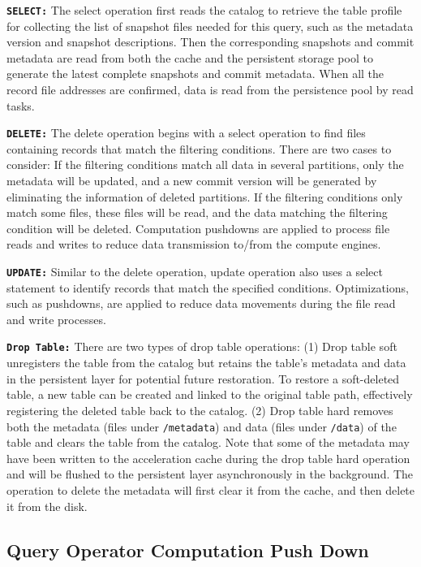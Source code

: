 \noindent \textbf{\texttt{SELECT:}} The select operation first reads the catalog to retrieve the table profile for collecting the list of snapshot files needed for this query, such as the metadata version and snapshot descriptions. Then the corresponding snapshots and commit metadata are read from both the  cache and the persistent storage pool to generate the latest complete snapshots and commit metadata. When all the record file addresses are confirmed, data is read from the persistence pool by read tasks.

\noindent \textbf{\texttt{DELETE:}} The delete operation begins with a select operation to find files containing records that match the filtering conditions. There are two cases to consider:
If the filtering conditions match all data in several partitions, only the metadata will be updated, and a new commit version will be generated by eliminating the information of deleted partitions.
If the filtering conditions only match some files, these files will be read, and the data matching the filtering condition will be deleted. Computation pushdowns are applied to process file reads and writes to reduce data transmission to/from the compute engines.


\noindent \textbf{\texttt{UPDATE:}} Similar to the delete operation, update operation also uses a select statement to identify records that match the specified conditions. Optimizations, such as pushdowns, are applied to reduce data movements during the file read and write processes.

\noindent \textbf{\texttt{Drop Table:}} There are two types of drop table operations:
 (1) Drop table soft unregisters the table from the catalog but retains the table's metadata and data in the persistent layer for potential future restoration. To restore a soft-deleted table, a new table can be created and linked to the original table path, effectively registering the deleted table back to the catalog.
(2) Drop table hard  removes both the metadata (files under \texttt{/metadata}) and data (files under \texttt{/data}) of the table and clears the table from the catalog. Note that some of the metadata may have been written to the acceleration cache during the drop table hard operation and will be flushed to the persistent layer asynchronously in the background. The operation to delete the metadata will first clear it from the cache, and then delete it from the disk.

\subsection{Query Operator Computation Push Down}~\label{subsec:pushdown}




